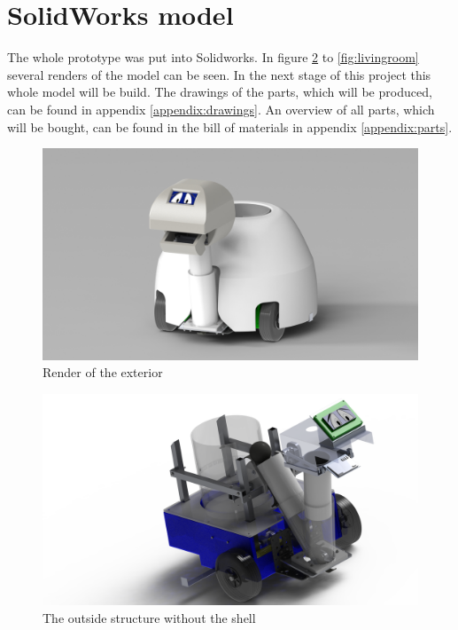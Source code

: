 \documentclass[11pt,twoside,a4paper]{report}
\begin{document}
\section{SolidWorks model}
The whole prototype was put into Solidworks. In figure \ref{fig:extRender} to \ref{fig:livingroom} several renders of the model can be seen. In the next stage of this project this whole model will be build. The drawings of the parts, which will be produced, can be found in appendix \ref{appendix:drawings}. An overview of all parts, which will be bought, can be found in the bill of materials in appendix \ref{appendix:parts}. 
\begin{figure}[H]
\begin{center}
\includegraphics[width=14cm]{Images/RenderAnne1.JPG}
\caption{Render of the exterior}
\label{fig:extRender}
\end{center}
\end{figure}

\begin{figure}[H]
\begin{center}
\includegraphics[width=14cm]{Images/superawesomerender.png}
\caption{The outside structure without the shell}
\label{fig:extRender}
\end{center}
\end{figure}
\end{document}

